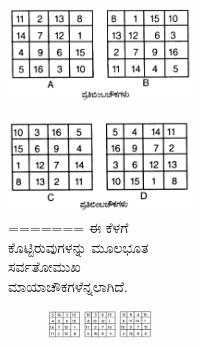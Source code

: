 \begin{figure}[H]
\begin{figure}[H]
\begin{figure}[H]
\begin{figure}[H]
\end{figure}
\begin{figure}[H]
\includegraphics{src/figures/chap4/fig4-13.jpg}
\end{figure}
\begin{figure}[H]
\includegraphics{src/figures/chap4/fig4-14.jpg}
=======
ಈ ಕೆಳಗೆ ಕೊಟ್ಟಿರುವುಗಳನ್ನು ಮೂಲಭೂತ ಸರ್ವತೋಮುಖ ಮಾಯಾಚೌಕಗಳೆನ್ನ\-ಲಾಗಿದೆ.
\begin{figure}[H]
\includegraphics[scale=.8]{src/figures/chap4/fig4.10.jpg}
\end{figure}


\end{figure}
\end{figure}
\end{figure}
\end{figure}
